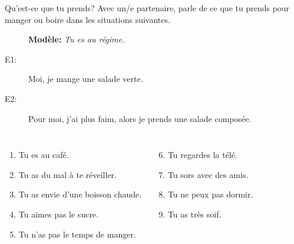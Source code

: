 \documentclass{beamer}
\begin{document}
  \begin{frame}{Qu'est-ce que tu prends?}
    Avec un/e partenaire, parle de ce que tu prends pour manger ou boire dans les situations suivantes. \\
    \begin{description}
      \item[] \textbf{Modèle:} \emph{Tu es au régime.}
      \item[E1:] Moi, je mange une salade verte.
      \item[E2:] Pour moi, j'ai plus faim, alors je prends une salade composée.
    \end{description}
    \begin{columns}[t]
        \begin{enumerate}
          \item Tu es au café.
          \item Tu as du mal à te réveiller.
          \item Tu as envie d'une boisson chaude.
          \item Tu aimes pas le sucre.
          \item Tu n'as pas le temps de manger.
        \end{enumerate}
        \begin{enumerate}
          \setcounter{enumi}{5}
          \item Tu regardes la télé.
          \item Tu sors avec des amis.
          \item Tu ne peux pas dormir.
          \item Tu as très soif.
        \end{enumerate}
    \end{columns}
  \end{frame}
\end{document}
